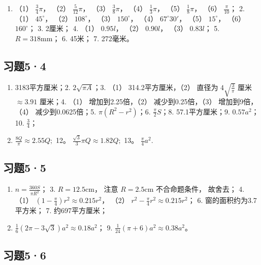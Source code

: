 \begin{enumerate}
\item
  （1） \(\frac{3}{4}\pi\)， （2） \(\frac{5}{12}\pi\)， （3）
  \(\frac{3}{8}\pi\)， （4） \(\frac{1}{3}\pi\)， （5）
  \(\frac{1}{8}\pi\)， （6） \(\frac{\pi}{10}\)； 2. （1）
  \(45^{\circ}\)， （2） \(108^{\circ}\)， （3） \(150^{\circ}\)， （4）
  \(67^{\circ}30'\)， （5） \(15^{\circ}\)， （6） \(160^{\circ}\)； 3.
  2厘米； 4. （1） \(0.95l\)， （2） \(0.90l\)， （3） \(0.83l\)； 5.
  \(R = 318\mathrm{mm}\)； 6. 45米； 7. 272毫米。
\end{enumerate}

\subsection{习题5·4}

\begin{enumerate}
\item
  3183平方厘米；2. \(2\sqrt{\pi A}\)；3. （1） 314.2平方厘米，（2）
  直径为 \(4\sqrt{\frac{3}{\pi}}\) 厘米 \(\approx 3.91\) 厘米；4. （1）
  增加到2.25倍，（2） 减少到0.25倍，（3） 增加到9倍，（4）
  减少到0.0625倍；5. \(\pi(R^2 - r^2)\)；6. \(\frac{\pi}{2} S\)；8.
  57.1平方厘米；9. \(0.57a^2\)；10. \(\frac{3}{4}\)；
\item
  \(\frac{8Q}{\pi} \approx 2.55Q;\) 12。
  \(\frac{\sqrt{3}}{3}\pi Q \approx 1.82Q;\) 13。 \(\frac{\pi}{4}a^2.\)
\end{enumerate}

\subsection{习题5·5}

\begin{enumerate}
\item
  \(n = \frac{360S}{\pi R^2}\)； 3. \(R = 12.5\mathrm{cm}\)， 注意
  \(R = 2.5\mathrm{cm}\) 不合命题条件， 故舍去； 4. （1）
  \(\left(1 - \frac{\pi}{4}\right)r^2 \approx 0.215r^2\)， （2）
  \(r^2 - \frac{\pi}{4}r^2 \approx 0.215r^2\)； 6.
  窗的面积约为3.7平方米； 7. 约697平方厘米；
\item
  \(\frac{1}{6} (2\pi - 3\sqrt{3})a^2 \approx 0.18a^2\)； 9.
  \(\frac{1}{24} (\pi + 6)a^2 \approx 0.38a^2\)。
\end{enumerate}

\subsection{习题5·6}

